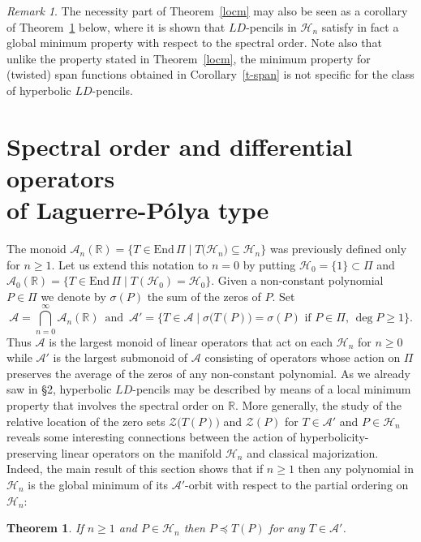 \documentclass[10pt,twoside,a4paper,reqno]{amsart}
\theoremstyle{plain}
\newtheorem{theo+}           {Theorem}
\theoremstyle{definition}
\theoremstyle{remark}
\newtheorem{rema+}           {Remark}
\newenvironment{theorem}{\begin{theo+}}{\end{theo+}}
\newenvironment{remark}{\begin{rema+}}{\end{rema+}}
\newcommand {\bR} {\mathbb {R}}
\newcommand {\si} {\sigma}
\newcommand {\calH} {\mathcal {H}}
\newcommand {\calA} {\mathcal {A}}
\newcommand {\calZ} {\mathcal {Z}}
\newcommand {\vP} {\varPi}
\newcommand {\E} {\text{End}\,}
\begin{document}
\begin{remark}\label{gen-LD}
The necessity part of Theorem~\ref{locm} may also be seen as 
a corollary of Theorem~\ref{orbit} below, where it is shown that 
$LD$-pencils in $\calH_n$ satisfy in fact a global minimum property with 
respect to the spectral order. Note also that unlike the 
property stated in Theorem~\ref{locm}, the minimum property for 
(twisted) span functions obtained in Corollary~\ref{t-span} is not specific 
for the class of hyperbolic $LD$-pencils.
\end{remark}

\section{Spectral order and differential operators \\ of Laguerre-P\'olya type}

The monoid $\calA_n(\bR)=\big\{T\in \E\vP\mid T\big(\calH_n\big)\subseteq 
\calH_n\big\}$ was previously defined only for $n\ge 1$. Let us 
extend this notation to $n=0$ by putting $\calH_0=\{1\}\subset \vP$ and 
$\calA_0(\bR)=\big\{T\in \E\vP\mid T(\calH_0)=\calH_0\}$. Given a 
non-constant polynomial 
$P\in \vP$ we denote by $\si(P)$ the sum of the zeros of $P$. Set
$$\calA=\bigcap_{n=0}^{\infty}\calA_n(\bR)\,\text{ and }\,
\calA'=\big\{T\in \calA\mid \si\big(T(P)\big)=\si(P)\text{ if } P\in \vP,
\,\deg P\ge 1\big\}.$$
Thus $\calA$ is the largest monoid of linear operators that act on each 
$\calH_n$ for $n\ge 0$ while $\calA'$ is the largest submonoid of 
$\calA$ consisting of operators whose action on $\vP$ preserves the average 
of the zeros of any non-constant polynomial. As we already saw in \S 2, 
hyperbolic $LD$-pencils may be described by means of a local minimum 
property that involves the spectral order on $\bR$. More generally, the study 
of the relative location of the zero sets $\calZ\big(T(P)\big)$ and $\calZ(P)$ 
for $T\in \calA'$ and $P\in \calH_n$ reveals some interesting connections 
between the action of hyperbolicity-preserving linear operators on the 
manifold $\calH_n$ and classical majorization. Indeed, the main result of this 
section shows that if $n\ge 1$ then any polynomial in $\calH_n$ is the global 
minimum of its $\calA'$-orbit with respect to the partial ordering on 
$\calH_n$:

\begin{theorem}\label{orbit}
If $n\ge 1$ and $P\in \calH_n$ then $P\preccurlyeq T(P)$ for any $T\in \calA'$.
\end{theorem}
\end{document}

